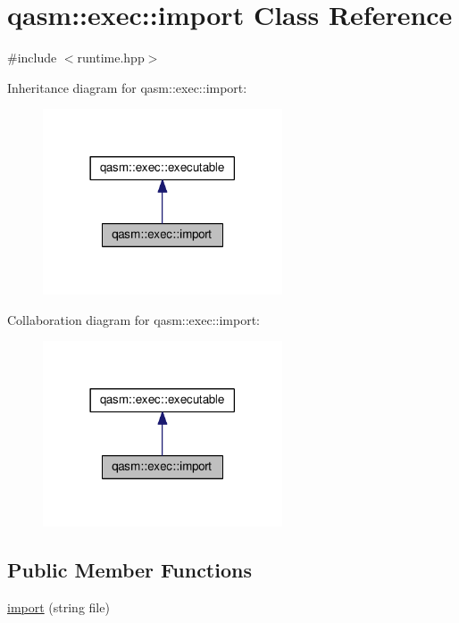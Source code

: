 \hypertarget{classqasm_1_1exec_1_1import}{}\section{qasm\+:\+:exec\+:\+:import Class Reference}
\label{classqasm_1_1exec_1_1import}


{\ttfamily \#include $<$runtime.\+hpp$>$}



Inheritance diagram for qasm\+:\+:exec\+:\+:import\+:
\nopagebreak
\begin{figure}[H]
\begin{center}
\leavevmode
\includegraphics[width=201pt]{classqasm_1_1exec_1_1import__inherit__graph}
\end{center}
\end{figure}


Collaboration diagram for qasm\+:\+:exec\+:\+:import\+:
\nopagebreak
\begin{figure}[H]
\begin{center}
\leavevmode
\includegraphics[width=201pt]{classqasm_1_1exec_1_1import__coll__graph}
\end{center}
\end{figure}
\subsection*{Public Member Functions}
\begin{DoxyCompactItemize}
\item 
\hyperlink{classqasm_1_1exec_1_1import_a95ac5a6910c5820c41314dc4de5dd98a}{import} (string file)
\end{DoxyCompactItemize}
